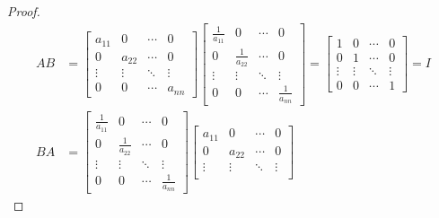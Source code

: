 \documentclass{article}
\begin{document}
\begin{question}{1.4}{}
\begin{proof}
\begin{align*}
      AB & = \begin{bmatrix}
               a_{11} & 0      & \cdots & 0      \\
               0      & a_{22} & \cdots & 0      \\
               \vdots & \vdots & \ddots & \vdots \\
               0      & 0      & \cdots & a_{nn}
             \end{bmatrix}\begin{bmatrix}
                            \frac{1}{a_{11}} & 0                & \cdots & 0                \\
                            0                & \frac{1}{a_{22}} & \cdots & 0                \\
                            \vdots           & \vdots           & \ddots & \vdots           \\
                            0                & 0                & \cdots & \frac{1}{a_{nn}}
                          \end{bmatrix} = \begin{bmatrix}
                                            1      & 0      & \cdots & 0      \\
                                            0      & 1      & \cdots & 0      \\
                                            \vdots & \vdots & \ddots & \vdots \\
                                            0      & 0      & \cdots & 1
                                          \end{bmatrix} = I \\
      BA & = \begin{bmatrix}
               \frac{1}{a_{11}} & 0                & \cdots & 0                \\
               0                & \frac{1}{a_{22}} & \cdots & 0                \\
               \vdots           & \vdots           & \ddots & \vdots           \\
               0                & 0                & \cdots & \frac{1}{a_{nn}}
             \end{bmatrix}\begin{bmatrix}
                            a_{11} & 0      & \cdots & 0      \\
                            0      & a_{22} & \cdots & 0      \\
                            \vdots & \vdots & \ddots & \vdots \\

\end{bmatrix}
\end{align*}
\end{proof}
\end{question}
\end{document}
